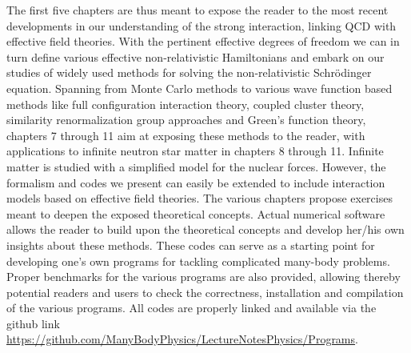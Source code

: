 The first five chapters are thus meant to
expose the reader to the most recent developments in our understanding
of the strong interaction, linking QCD with effective field
theories. With the pertinent effective degrees of freedom we can in
turn define various effective non-relativistic Hamiltonians and embark
on our studies of widely used methods for solving the non-relativistic
Schr\"odinger equation. Spanning from Monte Carlo methods to various
wave function based methods like full configuration interaction
theory, coupled cluster theory, similarity renormalization group
approaches and Green's function theory, chapters 7 through 11 aim at
exposing these methods to the reader, with applications to infinite neutron star
matter in chapters 8 through 11. Infinite matter is studied with a simplified model for the nuclear
forces. However, the formalism and codes we present can easily be
extended to include interaction models based on effective field
theories.  
The various chapters propose exercises meant to deepen the exposed theoretical concepts.
Actual numerical software allows the reader to build
upon the theoretical concepts and develop her/his own insights about
these methods. These codes can serve as a starting point for
developing one's own programs for tackling complicated many-body
problems.
Proper benchmarks for the various programs are also
provided, allowing thereby potential readers and users to check the
correctness, installation and compilation of the various programs. All
codes are properly linked and available via
the github link \url{https://github.com/ManyBodyPhysics/LectureNotesPhysics/Programs}.


